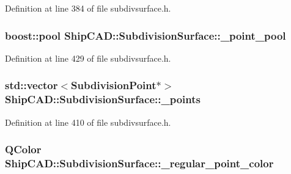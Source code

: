 Definition at line 384 of file subdivsurface.\-h.

\hypertarget{classShipCAD_1_1SubdivisionSurface_a98af3f1b9fa4412756cadf4fe561f062}{
\subsubsection[{\-\_\-point\-\_\-pool}]{\setlength{\rightskip}{0pt plus 5cm}boost\-::pool Ship\-C\-A\-D\-::\-Subdivision\-Surface\-::\-\_\-point\-\_\-pool\hspace{0.3cm}{\ttfamily [protected]}}}\label{classShipCAD_1_1SubdivisionSurface_a98af3f1b9fa4412756cadf4fe561f062}


Definition at line 429 of file subdivsurface.\-h.

\hypertarget{classShipCAD_1_1SubdivisionSurface_ab03b7f4694a63eeb3ebb831484cb1bff}{
\subsubsection[{\-\_\-points}]{\setlength{\rightskip}{0pt plus 5cm}std\-::vector$<${\bf Subdivision\-Point}$\ast$$>$ Ship\-C\-A\-D\-::\-Subdivision\-Surface\-::\-\_\-points\hspace{0.3cm}{\ttfamily [protected]}}}\label{classShipCAD_1_1SubdivisionSurface_ab03b7f4694a63eeb3ebb831484cb1bff}


Definition at line 410 of file subdivsurface.\-h.

\hypertarget{classShipCAD_1_1SubdivisionSurface_afee1585e376c34aa9b3be47f3a174cdb}{
\subsubsection[{\-\_\-regular\-\_\-point\-\_\-color}]{\setlength{\rightskip}{0pt plus 5cm}Q\-Color Ship\-C\-A\-D\-::\-Subdivision\-Surface\-::\-\_\-regular\-\_\-point\-\_\-color\hspace{0.3cm}{\ttfamily [protected]}}}\label{classShipCAD_1_1SubdivisionSurface_afee1585e376c34aa9b3be47f3a174cdb}


